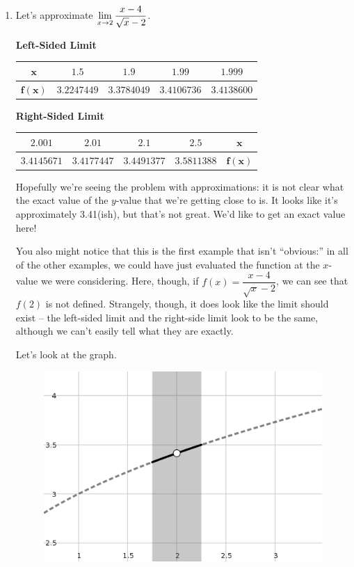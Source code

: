 \begin{enumerate}
  \item Let's approximate $\displaystyle \lim_{x\to 2} \dfrac{x-4}{\sqrt{x}-2}$.

  \textbf{Left-Sided Limit}

  \begin{tabular}{ccccc} \toprule
    $\bm{x}$ & $1.5$ & $1.9$ & $1.99$ & $1.999$ \\ \midrule
    $\bm{f(x)}$ & $3.2247449$ & $3.3784049$ & $3.4106736$ & $3.4138600$\\ \bottomrule
  \end{tabular}

  \begin{flushright}
    \textbf{Right-Sided Limit}

    \begin{tabular}{ccccc} \toprule
      $2.001$ & $2.01$ & $2.1$ & $2.5$ & $\bm{x}$ \\ \midrule
      $3.4145671$ & $3.4177447$ & $3.4491377$ & $3.5811388$ & $\bm{f(x)}$ \\ \bottomrule
    \end{tabular}
  \end{flushright}

  Hopefully we're seeing the problem with approximations: it is not clear what the exact value of the $y$-value that we're getting close to is.
  It looks like it's approximately 3.41(ish), but that's not great.
  We'd like to get an exact value here!

  You also might notice that this is the first example that isn't ``obvious:'' in all of the other examples, we could have just evaluated the function at the $x$-value we were considering.
  Here, though, if $f(x) = \dfrac{x-4}{\sqrt{x}-2}$, we can see that $f(2)$ is not defined.
  Strangely, though, it does look like the limit should exist -- the left-sided limit and the right-side limit look to be the same, although we can't easily tell what they are exactly.

  Let's look at the graph.

  \begin{figure}[h!tb]
    \includegraphics[scale=0.75]{./1_limits/images/1-1_graph3.png}
    \centering
  \end{figure}


\end{enumerate}
